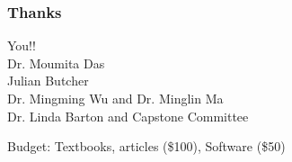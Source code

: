 \documentclass{beamer}
\begin{document}
  \begin{frame}
    \frametitle{Thanks}
  	\begin{center}
  	 You!! \\
     Dr. Moumita Das\\ Julian Butcher\\ Dr. Mingming Wu and Dr. Minglin Ma\\
     Dr. Linda Barton and Capstone Committee \\

	\vspace{0.3in}     
     
     Budget: Textbooks, articles (\$100), Software (\$50)
    
  	\end{center}
  	  
    \vfill
    
  \end{frame}
\end{document}
